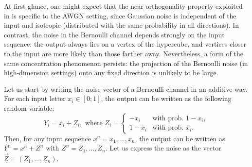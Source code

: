 \documentclass[10pt, conference]{IEEEtran}
\newcommand{\1}{\mathds{1}}
\begin{document}
At first glance, one might expect that the near-orthogonality property exploited in \cite{CDBW:Gauss} is specific to the AWGN setting, since Gaussian noise is independent of the input and isotropic (distributed with the same probability in all directions). In contrast, the noise in the Bernoulli channel depends strongly on the input sequence: the output always lies on a vertex of the hypercube, and vertices closer to the input are more likely than those farther away. Nevertheless, a form of the same concentration phenomenon persists: the projection of the Bernoulli noise (in high-dimension settings) onto any fixed direction is unlikely to be large.

Let us start by writing the noise vector of a Bernoulli channel in an additive way. For each input letter $x_i\in[0;1]$, the output can be written as the following random variable:
\begin{equation}
Y_i=x_i+Z_i, 
\,\,\text{where}\,\,
Z_i=\begin{cases}
-x_i    &\text{with prob. } 1-x_i, \\
1-x_i  &\text{with prob. } x_i.  
\end{cases}
\end{equation}
Then, for any input sequence $x^n=x_1,\dots,x_n$, the output can be written as $Y^n=x^n+Z^n$ with $Z^n=Z_1,\dots,Z_n$. Let us express the noise as the vector $\vec Z=(Z_1,\dots,Z_n)$.
\end{document}
